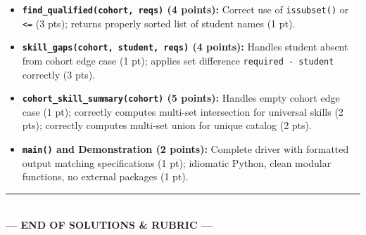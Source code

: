 \documentclass[11pt,a4paper]{article}
\begin{document}
\begin{rubricbox}
\begin{itemize}[leftmargin=1.5em,itemsep=1.5pt]
\item \textbf{\texttt{find\_qualified(cohort, reqs)} (4 points):} Correct use of \texttt{issubset()} or \texttt{<=} (3 pts); returns properly sorted list of student names (1 pt).
\item \textbf{\texttt{skill\_gaps(cohort, student, reqs)} (4 points):} Handles student absent from cohort edge case (1 pt); applies set difference \texttt{required - student} correctly (3 pts).
\item \textbf{\texttt{cohort\_skill\_summary(cohort)} (5 points):} Handles empty cohort edge case (1 pt); correctly computes multi-set intersection for universal skills (2 pts); correctly computes multi-set union for unique catalog (2 pts).
\item \textbf{\texttt{main()} and Demonstration (2 points):} Complete driver with formatted output matching specifications (1 pt); idiomatic Python, clean modular functions, no external packages (1 pt).
\end{itemize}
\end{rubricbox}

\vfill
\begin{center}
\rule{0.5\textwidth}{0.4pt}\\[1mm]
\textbf{\color{primaryblue}--- END OF SOLUTIONS \& RUBRIC ---}
\end{center}
\end{document}
